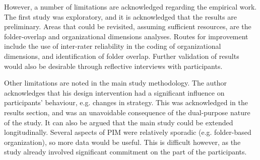 However, a number of limitations are acknowledged regarding the empirical work.
The first study was exploratory, and it is acknowledged that the results are preliminary.  Areas that could be revisited, assuming sufficient resources, are the folder-overlap and organizational dimensions analyses.  Routes for improvement include the use of inter-rater reliability in the coding of organizational dimensions, and identification of folder overlap. Further validation of results would also be desirable through reflective interviews with participants.

Other limitations are noted in the main study methodology.  The author acknowledges that his design intervention had a significant influence on participants' behaviour, e.g. changes in strategy.  This was acknowledged in the results section, and was an unavoidable consequence of the dual-purpose nature of the study.  
It can also be argued that the main study could be extended longitudinally. Several aspects of PIM were relatively sporadic (e.g. folder-based organization), so more data would be useful.  This is difficult however, as the study already involved significant commitment on the part of the participants.  %

